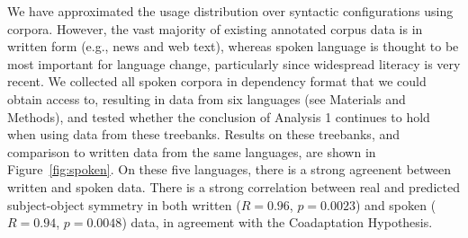 \documentclass[11pt,a4paper]{article}
\newcommand\comment[1]{{\color{red}#1}}
\newcommand\mhahn[1]{{\color{red}(#1)}}
\begin{document}



We have approximated the usage distribution over syntactic configurations using corpora.
However, the vast majority of existing annotated corpus data is in written form (e.g., news and web text), whereas spoken language is thought to be most important for language change, particularly since widespread literacy is very recent.
We collected all spoken corpora in dependency format that we could obtain access to, resulting in data from six languages (see Materials and Methods), and tested whether the conclusion of Analysis 1 continues to hold when using data from these treebanks.
Results on these treebanks, and comparison to written data from the same languages, are shown in Figure~\ref{fig:spoken}.
On these five languages, there is a strong agreenent between written and spoken data.
There is a strong correlation between real and predicted subject-object symmetry in both written ($R=0.96$, $p=0.0023$) and spoken ($R=0.94$, $p=0.0048$) data, in agreement with the Coadaptation Hypothesis.



\end{document}
